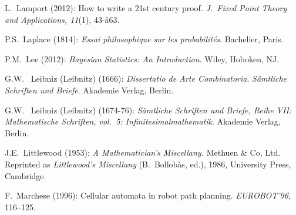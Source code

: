 \begin{thebibliography}{999}

L.~Lamport (2012): How to write a 21st century proof.
{\it J.~Fixed Point Theory and Applications, 11}(1), 43-â63.

P.S.~Laplace (1814):
{\it Essai philosophique sur les probabilit\'{e}s}.
Bachelier, Paris.

P.M.~Lee (2012): {\it Bayesian Statistics: An Introduction}.  Wiley,
Hoboken, NJ.

G.W.~ Leibniz (Leibnitz) (1666):
{\it Dissertatio de Arte Combinatoria}.
{\it S\"{a}mtliche Schriften und Briefe}.
Akademie Verlag, Berlin.

G.W.~ Leibniz (Leibnitz) (1674-76):
{\it S\"{a}mtliche Schriften und Briefe, Reihe VII: Mathematische Schriften, vol.~5: Infinitesimalmathematik}.
Akademie Verlag, Berlin.


 


J.E.~Littlewood (1953):
{\it A Mathematician's Miscellany.}
Methuen \& Co, Ltd.
Reprinted as {\it Littlewood's Miscellany} (B.~Bollob\`{a}s, ed.),
1986, University Press, Cambridge.




F.~Marchese (1996): Cellular automata in robot path planning.
{\it EUROBOT'96}, 116--125.


\end{thebibliography}
